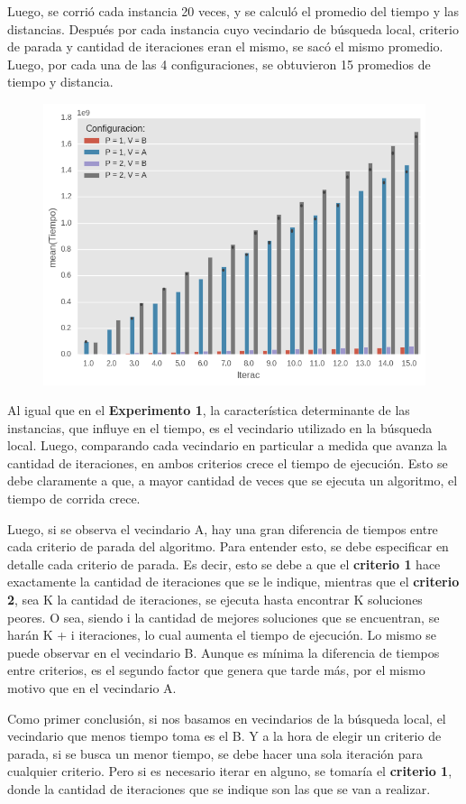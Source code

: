Luego, se corrió cada instancia 20 veces, y se calculó el promedio del tiempo y las distancias. 
Después por cada instancia cuyo vecindario de búsqueda local, criterio de parada y cantidad de iteraciones eran el mismo, se sacó el mismo promedio. Luego, por cada una de las 4 configuraciones, se obtuvieron 15 promedios de tiempo y distancia.



\begin{figure}[H]
    \begin{center}
      \includegraphics[width=0.7\columnwidth]{imagenes/Ej4/ej4_exp2_Tiempo.png}
    \end{center}
\end{figure}

Al igual que en el \textbf{Experimento 1}, la característica determinante de las instancias, que influye en el tiempo, es el vecindario utilizado en la búsqueda local. Luego, comparando cada vecindario en particular a medida que avanza la cantidad de iteraciones, en ambos criterios crece el tiempo de ejecución. Esto se debe claramente a que, a mayor cantidad de veces que se ejecuta un algoritmo, el tiempo de corrida crece. 
\par Luego, si se observa el vecindario A, hay una gran diferencia de tiempos entre cada criterio de parada del algoritmo. Para entender esto, se debe especificar en detalle cada criterio de parada. Es decir, esto se debe a que el \textbf{criterio 1} hace exactamente la cantidad de iteraciones que se le indique, mientras que el \textbf{criterio 2}, sea K la cantidad de iteraciones, se ejecuta hasta encontrar K soluciones peores. O sea, siendo i la cantidad de mejores soluciones que se encuentran, se harán K + i iteraciones, lo cual aumenta el tiempo de ejecución. Lo mismo se puede observar en el vecindario B. Aunque es mínima la diferencia de tiempos entre criterios, es el segundo factor que genera que tarde más, por el mismo motivo que en el vecindario A.
\par Como primer conclusión, si nos basamos en vecindarios de la búsqueda local, el vecindario que menos tiempo toma es el B. Y a la hora de elegir un criterio de parada, si se busca un menor tiempo, se debe hacer una sola iteración para cualquier criterio. Pero si es necesario iterar en alguno, se tomaría el \textbf{criterio 1}, donde la cantidad de iteraciones que se indique son las que se van a realizar.

